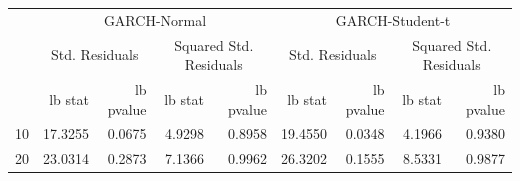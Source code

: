 \begin{table}[htbp]
\centering
\begin{tabular}{lrrrrrrrr}
\toprule
 & \multicolumn{4}{c}{GARCH-Normal} & \multicolumn{4}{c}{GARCH-Student-t} \\
 & \multicolumn{2}{c}{Std. Residuals} & \multicolumn{2}{c}{Squared Std. Residuals} & \multicolumn{2}{c}{Std. Residuals} & \multicolumn{2}{c}{Squared Std. Residuals} \\
 & lb stat & lb pvalue & lb stat & lb pvalue & lb stat & lb pvalue & lb stat & lb pvalue \\
\midrule
10 & 17.3255 & 0.0675 & 4.9298 & 0.8958 & 19.4550 & 0.0348 & 4.1966 & 0.9380 \\
20 & 23.0314 & 0.2873 & 7.1366 & 0.9962 & 26.3202 & 0.1555 & 8.5331 & 0.9877 \\
\bottomrule
\end{tabular}
\label{tab:residual_diagnostics}
\end{table}
